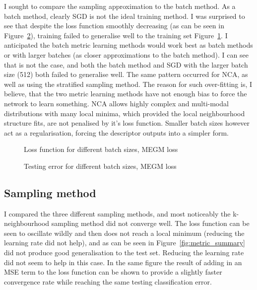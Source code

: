 I sought to compare the sampling approximation to the batch method.
As a batch method, clearly \gls{SGD} is not the ideal training method. I was
surprised to see that despite the loss function smoothly decreasing (as can be
seen in Figure~\ref{fig:metric_megm_test}), training failed to generalise well to the training set Figure~\ref{fig:metric_megm_loss}.
I anticipated the batch metric learning methods would work best as batch
methods or with larger batches (as closer approximations to the batch method).
I can see that is not the case, and both the batch method and \gls{SGD} with the
larger batch size (512) both failed to generalise well. The same pattern occurred
for \gls{NCA}, as well as using the stratified sampling method.
The reason for such over-fitting is, I believe, that the two metric learning
methods have not enough bias to force the network to learn something. \gls{NCA}
allows highly complex and multi-modal distributions with many local minima,
which provided the local neighbourhood structure fits, are not penalised by it’s
loss function. Smaller batch sizes however act as a regularisation, forcing the
descriptor outputs into a simpler form.



\begin{figure}[ht]
   
   \caption{Loss function for different batch sizes, MEGM loss}
   \label {fig:metric_megm_loss}
\end{figure}

\begin{figure}[ht]
   
   \caption{Testing error for different batch sizes, MEGM loss}
   \label {fig:metric_megm_test}
\end{figure}



\subsection{Sampling method}

I compared the three different sampling methods, and  most noticeably the k-neighbourhood sampling method did not converge well. The loss function can be seen to oscillate wildly and then does not reach a local minimum (reducing the learning rate did not help), and as can be seen in Figure~\ref{fig:metric_summary} did not produce good generalisation to the test set. Reducing the learning rate did not seem to help in this case. In the same figure the result of adding in an \gls{MSE} term to the loss function can be shown to provide a slightly faster convergence rate while reaching the same testing classification error. 


